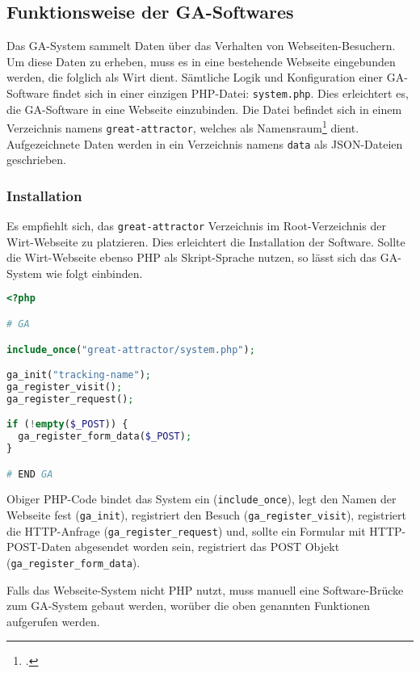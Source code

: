 \subsection{Funktionsweise der GA-Softwares}
\label{sub:funktionsweise_der_ga_softwares}

Das GA-System sammelt Daten über das Verhalten von Webseiten-Besuchern. Um
diese Daten zu erheben, muss es in eine bestehende Webseite eingebunden werden,
die folglich als Wirt dient. Sämtliche Logik und Konfiguration einer
GA-Software findet sich in einer einzigen PHP-Datei: \texttt{system.php}. Dies
erleichtert es, die GA-Software in eine Webseite einzubinden. Die Datei
befindet sich in einem Verzeichnis namens \texttt{great-attractor}, welches als
Namensraum\footcite{wp:namensraum} dient. Aufgezeichnete Daten werden in ein
Verzeichnis namens \texttt{data} als JSON-Dateien geschrieben.

\subsubsection{Installation}
\label{ssub:ga_installation}
Es empfiehlt sich, das \texttt{great-attractor} Verzeichnis im Root-Verzeichnis
der Wirt-Webseite zu platzieren. Dies erleichtert die Installation der
Software. Sollte die Wirt-Webseite ebenso PHP als Skript-Sprache nutzen, so
lässt sich das GA-System wie folgt einbinden.

\begin{lstlisting}[language=PHP]
<?php

# GA

include_once("great-attractor/system.php");

ga_init("tracking-name");
ga_register_visit();
ga_register_request();

if (!empty($_POST)) {
  ga_register_form_data($_POST);
}

# END GA
\end{lstlisting}

Obiger PHP-Code bindet das System ein (\texttt{include\_once}), legt den Namen
der Webseite fest (\texttt{ga\_init}), registriert den Besuch
(\texttt{ga\_register\_visit}), registriert die HTTP-Anfrage
(\texttt{ga\_register\_request}) und, sollte ein Formular mit HTTP-POST-Daten
abgesendet worden sein, registriert das POST Objekt
(\texttt{ga\_register\_form\_data}).

Falls das Webseite-System nicht PHP nutzt, muss manuell eine Software-Brücke
zum GA-System gebaut werden, worüber die oben genannten Funktionen aufgerufen
werden.

